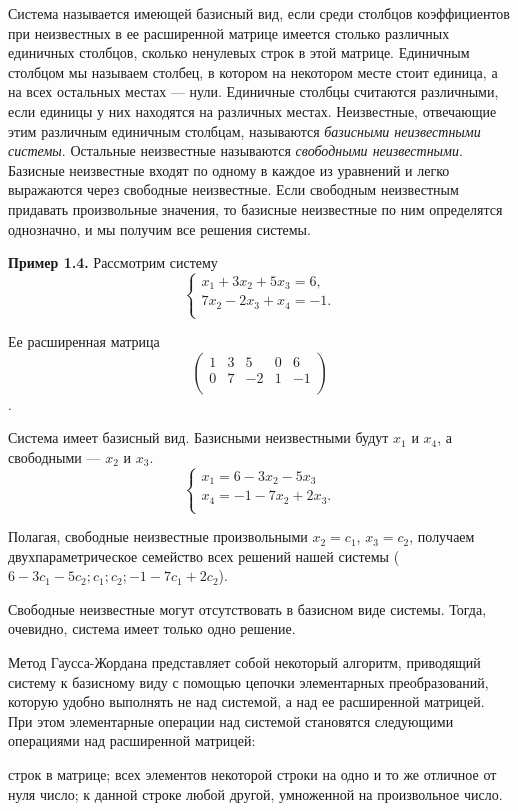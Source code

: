 \documentclass{article}
\begin{document}
Система называется имеющей базисный вид, если среди столбцов коэффициентов при неизвестных в ее расширенной матрице имеется столько  различных  единичных  столбцов, сколько  ненулевых строк в этой матрице. Единичным столбцом мы называем столбец, в котором на некотором месте стоит единица, а на всех остальных местах — нули. Единичные столбцы считаются различными, если единицы у них находятся на различных местах. Неизвестные, отвечающие этим различным единичным столбцам, называются \textit{базисными неизвестными системы}. Остальные неизвестные называются \textit{свободными неизвестными}. Базисные неизвестные входят по одному в каждое из уравнений и легко выражаются через свободные неизвестные. Если свободным неизвестным придавать произвольные значения, то базисные неизвестные по ним определятся однозначно, и мы получим все решения системы.

\textbf{Пример 1.4.} Рассмотрим систему
\begin{equation*}
\begin{cases}
x_1+ 3x_2+ 5x_3 = 6,\\
7x_2- 2x_3+ x_4 = -1.\\
\end{cases}
\end{equation*}

Ее расширенная матрица
$$\left(\begin{array}{rrrr|r} 
1&3&5&0&6\\
0&7&-2&1&-1\\
\end{array}\right)$$.

Система имеет базисный вид. Базисными неизвестными будут $x_1$ и $x_4$, а свободными — $x_2$ и $x_3$.
\begin{equation*}
\begin{cases}
x_1 = 6-3x_2 -5x_3\\
x_4 = -1 -7x_2 +2x_3.\\
\end{cases}
\end{equation*}

Полагая, свободные неизвестные произвольными $x_2=c_1$, $x_3=c_2$, получаем двухпараметрическое семейство всех решений нашей системы ($6-3c_1-5c_2;c_1;c_2;-1-7c_1+2c_2$).

Свободные неизвестные могут отсутствовать в базисном виде системы. Тогда, очевидно, система имеет только одно решение.

Метод Гаусса-Жордана представляет собой некоторый алгоритм, приводящий систему к базисному виду с помощью цепочки элементарных преобразований, которую удобно выполнять не над системой, а над ее расширенной матрицей. При этом элементарные операции над системой становятся следующими операциями над расширенной матрицей:
		\begin{enumerate}
			\renewcommand{\theenumi}{(\arabic{enumi})}
			\renewcommand{\labelenumi}{\arabic{enumi})}
			 строк в матрице;
			 всех элементов некоторой строки на одно и то же отличное от нуля число;
			 к данной строке любой другой, умноженной на произвольное число.
		\end{enumerate}
\end{document}
